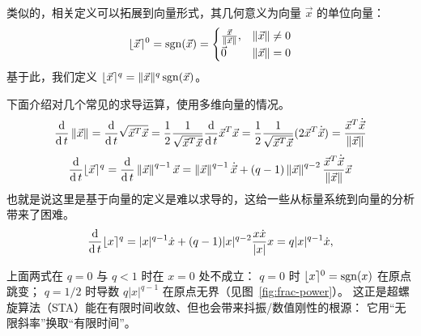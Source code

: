 类似的，相关定义可以拓展到向量形式，其几何意义为向量 $\vec{x}$ 的单位向量：
\begin{equation}
	\lfloor \vec{x} \rceil^0=\operatorname{sgn}(\vec{x})=\begin{cases}
		\frac{\vec{x}}{\left\lVert\vec{x}\right\rVert}, & \left\lVert\vec{x}\right\rVert\neq 0\\
		\vec{0}   & \left\lVert\vec{x}\right\rVert=0
	\end{cases}
\end{equation}
基于此，我们定义 $\lfloor \vec{x} \rceil^q=\|\vec{x}\|^q \operatorname{sgn}(\vec{x})$。

下面介绍对几个常见的求导运算，使用多维向量的情况。
\begin{equation}
	\frac{\operatorname{d}}{\operatorname{d} t} \left\lVert\vec{x}\right\rVert
	= \frac{\operatorname{d}}{\operatorname{d} t} \sqrt{\vec{x}^T\vec{x}}
	= \frac12 \frac{1}{\sqrt{\vec{x}^T\vec{x}}}\frac{\operatorname{d}}{\operatorname{d} t} {\vec{x}^T\vec{x}}
	= \frac12 \frac{1}{\sqrt{\vec{x}^T\vec{x}}} (2 \vec{x}^T \dot{\vec{x}})
	= \frac{\vec{x}^T\dot{\vec{x}}}{\left\lVert\vec{x}\right\rVert}
\end{equation}
\begin{equation}
	\frac{\operatorname{d}}{\operatorname{d} t} \lfloor \vec{x} \rceil^q
	=\frac{\operatorname{d}}{\operatorname{d} t} \left\lVert\vec{x}\right\rVert^{q-1} \vec{x}
	=\left\lVert\vec{x}\right\rVert^{q-1} \dot{\vec{x}}+(q-1) \left\lVert\vec{x}\right\rVert^{q-2}  \frac{\vec{x}^T\dot{\vec{x}}}{\left\lVert\vec{x}\right\rVert}\vec{x}
\end{equation}
也就是说这里是基于向量的定义是难以求导的，这给一些从标量系统到向量的分析带来了困难。
\begin{equation}
	\frac{\operatorname{d}}{\operatorname{d} t} \lfloor x \rceil^q
	=|x|^{q-1} \dot{x}+(q-1) |x|^{q-2}  \frac{x \dot{x}}{|x|}x
	=q|x|^{q-1}\dot{x},
\end{equation}

\begin{remark}[$q=0$ 与 $q<1$ 的奇异性]
上面两式在 $q=0$ 与 $q<1$ 时在 $x=0$ 处不成立：
$q=0$ 时 $\lfloor x \rceil^0=\operatorname{sgn}(x)$ 在原点跳变；
$q=1/2$ 时导数 $q|x|^{q-1}$ 在原点无界（见图~\ref{fig:frac-power}）。
这正是超螺旋算法（STA）能在有限时间收敛、但也会带来抖振/数值刚性的根源：
它用“无限斜率”换取“有限时间”。
\end{remark}

